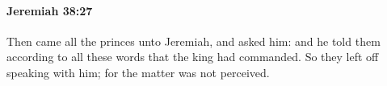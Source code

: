 
		\paragraph{Jeremiah 38:27} %
			\label{JEREMIAH-38-27}

			Then came all the princes unto Jeremiah, and asked him: and he told them according to all these words that the king had commanded. So they left off speaking with him; for the matter was not perceived.


